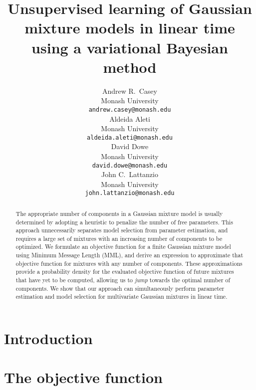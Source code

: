 \documentclass{article}
\title{
  Unsupervised learning of Gaussian mixture models in linear time
  using a variational Bayesian method
}
\author{
  Andrew R.~Casey\\
  Monash University\\
  \texttt{andrew.casey@monash.edu}\\
  \And 
  Aldeida Aleti\\
  Monash University\\
  \texttt{aldeida.aleti@monash.edu}\\
  \AND
  David Dowe\\
  Monash University\\
  \texttt{david.dowe@monash.edu}\\
  \And
  John C.~Lattanzio\\
  Monash University\\
  \texttt{john.lattanzio@monash.edu}\\
}
\begin{document}

\maketitle

\begin{abstract}
  The appropriate number of components in a Gaussian mixture model is usually 
  determined by adopting a heuristic to penalize the number of free parameters.
  This approach unnecessarily separates model selection from parameter estimation,
  and requires a large set of mixtures with an increasing number of components
  to be optimized.
  We formulate an objective function for a finite Gaussian mixture model using
  Minimum Message Length (MML), and derive an expression to approximate that
  objective function for mixtures with any number of components. 
  These approximations provide a probability density for the evaluated objective
  function of future mixtures that have yet to be computed, allowing us to 
  \emph{jump} towards the optimal number of components.
  We show that our approach can simultaneously perform parameter estimation and 
  model selection for multivariate Gaussian mixtures in linear time.
\end{abstract}

\section{Introduction}



\section{The objective function}
\label{sec:objective-function}
\end{document}
